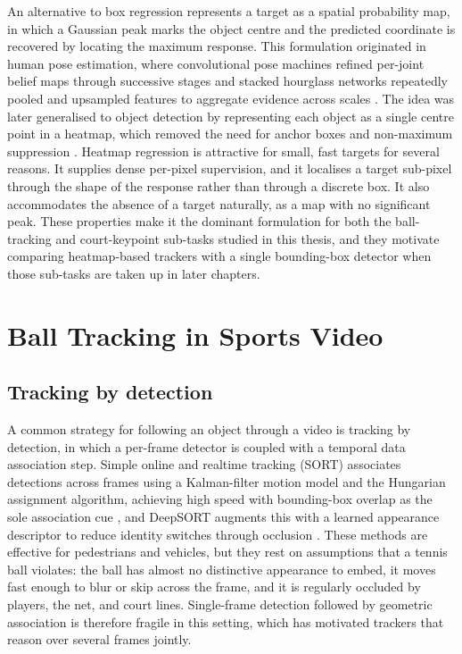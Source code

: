 An alternative to box regression represents a target as a spatial probability
map, in which a Gaussian peak marks the object centre and the predicted
coordinate is recovered by locating the maximum response. This formulation
originated in human pose estimation, where convolutional pose machines
refined per-joint belief maps through successive stages \cite{wei2016cpm} and
stacked hourglass networks repeatedly pooled and upsampled features to
aggregate evidence across scales \cite{newell2016hourglass}. The idea was
later generalised to object detection by representing each object as a single
centre point in a heatmap, which removed the need for anchor boxes and
non-maximum suppression \cite{zhou2019centernet}. Heatmap regression is
attractive for small, fast targets for several reasons. It supplies dense
per-pixel supervision, and it localises a target sub-pixel through the shape
of the response rather than through a discrete box. It also accommodates the
absence of a target naturally, as a map with no significant peak. These
properties make it the dominant formulation for both the ball-tracking and
court-keypoint sub-tasks studied in this thesis, and they motivate
comparing heatmap-based trackers with a single bounding-box detector when
those sub-tasks are taken up in later chapters.

\section{Ball Tracking in Sports Video}
\label{sec:rw-ball}

\subsection{Tracking by detection}
\label{sec:rw-tbd}

A common strategy for following an object through a video is tracking by
detection, in which a per-frame detector is coupled with a temporal data
association step. Simple online and realtime tracking (SORT) associates
detections across frames using a Kalman-filter motion model and the
Hungarian assignment algorithm, achieving high speed with bounding-box
overlap as the sole association cue \cite{bewley2016sort}, and DeepSORT
augments this with a learned appearance descriptor to reduce identity switches
through occlusion \cite{wojke2017deepsort}. These methods are effective for
pedestrians and vehicles, but they rest on assumptions that a tennis ball
violates: the ball has almost no distinctive appearance to embed, it moves
fast enough to blur or skip across the frame, and it is regularly occluded by
players, the net, and court lines. Single-frame detection followed by
geometric association is therefore fragile in this setting, which has
motivated trackers that reason over several frames jointly.

